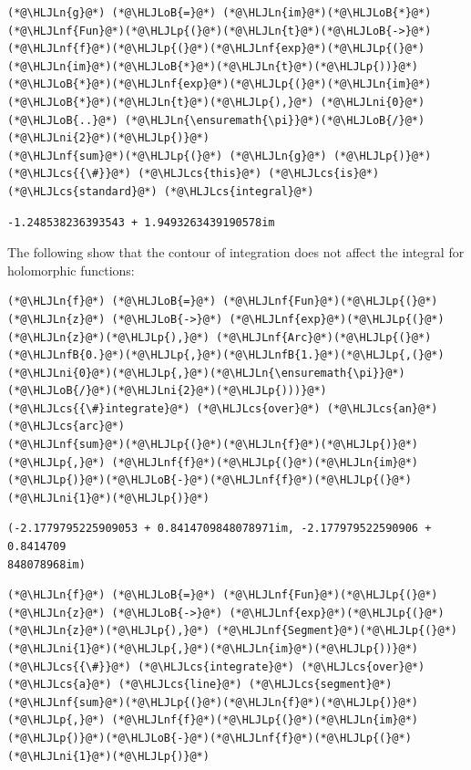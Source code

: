 \documentclass[12pt,a4paper]{article}
\newcommand{\HLJLn}[1]{#1}
\newcommand{\HLJLnf}[1]{\textcolor[RGB]{66,102,213}{#1}}
\newcommand{\HLJLnfB}[1]{\textcolor[RGB]{59,151,46}{#1}}
\newcommand{\HLJLni}[1]{\textcolor[RGB]{59,151,46}{#1}}
\newcommand{\HLJLoB}[1]{\textcolor[RGB]{102,102,102}{\textbf{#1}}}
\newcommand{\HLJLp}[1]{#1}
\newcommand{\HLJLcs}[1]{\textcolor[RGB]{153,153,119}{\textit{#1}}}
\begin{document}
\begin{lstlisting}
(*@\HLJLn{g}@*) (*@\HLJLoB{=}@*) (*@\HLJLn{im}@*)(*@\HLJLoB{*}@*)(*@\HLJLnf{Fun}@*)(*@\HLJLp{(}@*)(*@\HLJLn{t}@*)(*@\HLJLoB{->}@*) (*@\HLJLnf{f}@*)(*@\HLJLp{(}@*)(*@\HLJLnf{exp}@*)(*@\HLJLp{(}@*)(*@\HLJLn{im}@*)(*@\HLJLoB{*}@*)(*@\HLJLn{t}@*)(*@\HLJLp{))}@*)(*@\HLJLoB{*}@*)(*@\HLJLnf{exp}@*)(*@\HLJLp{(}@*)(*@\HLJLn{im}@*)(*@\HLJLoB{*}@*)(*@\HLJLn{t}@*)(*@\HLJLp{),}@*) (*@\HLJLni{0}@*) (*@\HLJLoB{..}@*) (*@\HLJLn{\ensuremath{\pi}}@*)(*@\HLJLoB{/}@*)(*@\HLJLni{2}@*)(*@\HLJLp{)}@*)
(*@\HLJLnf{sum}@*)(*@\HLJLp{(}@*) (*@\HLJLn{g}@*) (*@\HLJLp{)}@*)  (*@\HLJLcs{{\#}}@*) (*@\HLJLcs{this}@*) (*@\HLJLcs{is}@*) (*@\HLJLcs{standard}@*) (*@\HLJLcs{integral}@*)
\end{lstlisting}

\begin{lstlisting}
-1.248538236393543 + 1.9493263439190578im
\end{lstlisting}


The following show that the contour of integration does not affect the integral for holomorphic functions:


\begin{lstlisting}
(*@\HLJLn{f}@*) (*@\HLJLoB{=}@*) (*@\HLJLnf{Fun}@*)(*@\HLJLp{(}@*) (*@\HLJLn{z}@*) (*@\HLJLoB{->}@*) (*@\HLJLnf{exp}@*)(*@\HLJLp{(}@*)(*@\HLJLn{z}@*)(*@\HLJLp{),}@*) (*@\HLJLnf{Arc}@*)(*@\HLJLp{(}@*)(*@\HLJLnfB{0.}@*)(*@\HLJLp{,}@*)(*@\HLJLnfB{1.}@*)(*@\HLJLp{,(}@*)(*@\HLJLni{0}@*)(*@\HLJLp{,}@*)(*@\HLJLn{\ensuremath{\pi}}@*)(*@\HLJLoB{/}@*)(*@\HLJLni{2}@*)(*@\HLJLp{)))}@*) (*@\HLJLcs{{\#}integrate}@*) (*@\HLJLcs{over}@*) (*@\HLJLcs{an}@*) (*@\HLJLcs{arc}@*)
(*@\HLJLnf{sum}@*)(*@\HLJLp{(}@*)(*@\HLJLn{f}@*)(*@\HLJLp{)}@*)  (*@\HLJLp{,}@*) (*@\HLJLnf{f}@*)(*@\HLJLp{(}@*)(*@\HLJLn{im}@*)(*@\HLJLp{)}@*)(*@\HLJLoB{-}@*)(*@\HLJLnf{f}@*)(*@\HLJLp{(}@*)(*@\HLJLni{1}@*)(*@\HLJLp{)}@*)
\end{lstlisting}

\begin{lstlisting}
(-2.1779795225909053 + 0.8414709848078971im, -2.177979522590906 + 0.8414709
848078968im)
\end{lstlisting}


\begin{lstlisting}
(*@\HLJLn{f}@*) (*@\HLJLoB{=}@*) (*@\HLJLnf{Fun}@*)(*@\HLJLp{(}@*) (*@\HLJLn{z}@*) (*@\HLJLoB{->}@*) (*@\HLJLnf{exp}@*)(*@\HLJLp{(}@*)(*@\HLJLn{z}@*)(*@\HLJLp{),}@*) (*@\HLJLnf{Segment}@*)(*@\HLJLp{(}@*)(*@\HLJLni{1}@*)(*@\HLJLp{,}@*)(*@\HLJLn{im}@*)(*@\HLJLp{))}@*) (*@\HLJLcs{{\#}}@*) (*@\HLJLcs{integrate}@*) (*@\HLJLcs{over}@*) (*@\HLJLcs{a}@*) (*@\HLJLcs{line}@*) (*@\HLJLcs{segment}@*)
(*@\HLJLnf{sum}@*)(*@\HLJLp{(}@*)(*@\HLJLn{f}@*)(*@\HLJLp{)}@*)  (*@\HLJLp{,}@*) (*@\HLJLnf{f}@*)(*@\HLJLp{(}@*)(*@\HLJLn{im}@*)(*@\HLJLp{)}@*)(*@\HLJLoB{-}@*)(*@\HLJLnf{f}@*)(*@\HLJLp{(}@*)(*@\HLJLni{1}@*)(*@\HLJLp{)}@*)
\end{lstlisting}
\end{document}
